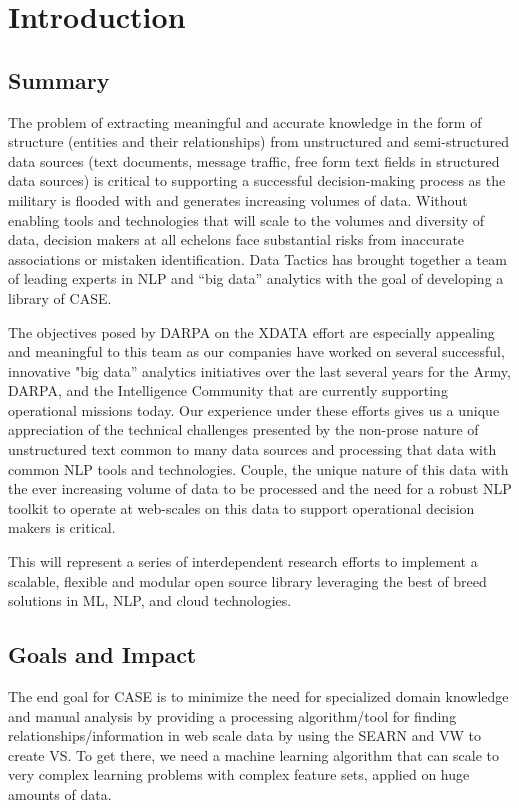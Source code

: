 \section{Introduction}


\subsection{Summary}
The problem of extracting meaningful and accurate knowledge in the form of structure (entities and their relationships) from unstructured and semi-structured data sources (text documents, message traffic, free form text fields in structured data sources) is critical to supporting a successful decision-making process as the military is flooded with and generates increasing volumes of data. Without enabling tools and technologies that will scale to the volumes and diversity of data, decision makers at all echelons face substantial risks from inaccurate associations or mistaken identification. Data Tactics has brought together a team of leading experts in \ac{NLP}  and “big data” analytics with the goal of developing a library of \ac{CASE}.

The objectives posed by DARPA on the XDATA effort are especially appealing and meaningful to this team as our companies have worked on several successful, innovative "big data” analytics initiatives over the last several years for the Army, DARPA, and the Intelligence Community that are currently supporting operational missions today. Our experience under these efforts gives us a unique appreciation of the technical challenges presented by the non-prose nature of unstructured text common to many data sources and processing that data with common \ac{NLP} tools and technologies. Couple, the unique nature of this data with the ever increasing volume of data to be processed and the need for a robust \ac{NLP} toolkit to operate at web-scales on this data to support operational decision makers is critical.

This will represent a series of interdependent research efforts to implement a scalable, flexible and modular open source library leveraging the best of breed solutions in \ac{ML}, \ac{NLP}, and cloud technologies.

\subsection{Goals and Impact}
The end goal for \ac{CASE} is to minimize the need for specialized domain knowledge and manual analysis by providing a processing algorithm/tool for finding relationships/information in web scale data by using the \ac{SEARN} and \ac{VW} to create \ac{VS}. To get there, we need a machine learning algorithm that can scale to very complex learning problems with complex feature sets, applied on huge amounts of data.

